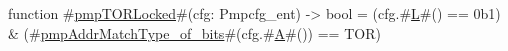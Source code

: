 function #\hyperref[sailRISCVzpmpTORLocked]{pmpTORLocked}#(cfg: Pmpcfg_ent) -> bool =
   (cfg.#\hyperref[sailRISCVzL]{L}#() == 0b1) & (#\hyperref[sailRISCVzpmpAddrMatchTypezyofzybits]{pmpAddrMatchType\_of\_bits}#(cfg.#\hyperref[sailRISCVzA]{A}#()) == TOR)
